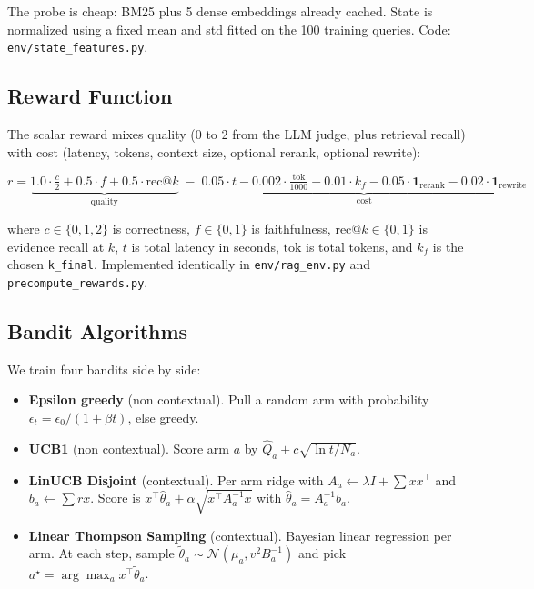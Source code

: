 \documentclass{article}
\begin{document}
The probe is cheap: BM25 plus 5 dense embeddings already cached. State is normalized using a fixed mean and std fitted on the 100 training queries. Code: \texttt{env/state\_features.py}.

\subsection{Reward Function}

The scalar reward mixes quality (0 to 2 from the LLM judge, plus retrieval recall) with cost (latency, tokens, context size, optional rerank, optional rewrite):

\begin{equation}
\label{eq:reward}
r =
\underbrace{1.0 \cdot \tfrac{c}{2} + 0.5 \cdot f + 0.5 \cdot \text{rec}@k}_{\text{quality}}
\;-\;
\underbrace{0.05 \cdot t - 0.002 \cdot \tfrac{\text{tok}}{1000} - 0.01 \cdot k_f - 0.05 \cdot \mathbf{1}_{\text{rerank}} - 0.02 \cdot \mathbf{1}_{\text{rewrite}}}_{\text{cost}}
\end{equation}

where $c \in \{0,1,2\}$ is correctness, $f \in \{0,1\}$ is faithfulness, $\text{rec}@k \in \{0,1\}$ is evidence recall at $k$, $t$ is total latency in seconds, $\text{tok}$ is total tokens, and $k_f$ is the chosen \texttt{k\_final}. Implemented identically in \texttt{env/rag\_env.py} and \texttt{precompute\_rewards.py}.

\subsection{Bandit Algorithms}

We train four bandits side by side:
\begin{itemize}
    \item \textbf{Epsilon greedy} (non contextual). Pull a random arm with probability $\epsilon_t = \epsilon_0 / (1 + \beta t)$, else greedy.
    \item \textbf{UCB1} (non contextual). Score arm $a$ by $\hat{Q}_a + c \sqrt{\ln t / N_a}$.
    \item \textbf{LinUCB Disjoint} (contextual). Per arm ridge with $A_a \leftarrow \lambda I + \sum x x^\top$ and $b_a \leftarrow \sum r x$. Score is $x^\top \hat{\theta}_a + \alpha \sqrt{x^\top A_a^{-1} x}$ with $\hat{\theta}_a = A_a^{-1} b_a$.
    \item \textbf{Linear Thompson Sampling} (contextual). Bayesian linear regression per arm. At each step, sample $\tilde{\theta}_a \sim \mathcal{N}(\mu_a, v^2 B_a^{-1})$ and pick $a^\star = \arg\max_a x^\top \tilde{\theta}_a$.
\end{itemize}
\end{document}
